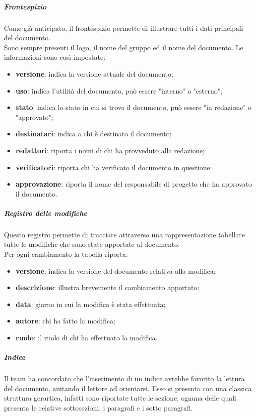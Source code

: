 \subparagraph{Frontespizio}
Come già anticipato, il frontespizio permette di illustrare tutti i dati principali del documento.\\
Sono sempre presenti il logo, il nome del gruppo ed il nome del documento.
Le informazioni sono così impostate:
\begin{itemize}
	\item\textbf{versione}: indica la versione attuale del documento;
	\item\textbf{uso}: indica l'utilità del documento, può essere "interno" o "esterno";
	\item\textbf{stato}: indica lo stato in cui si trova il documento, può essere "in redazione" o "approvato";
	\item\textbf{destinatari}: indica a chi è destinato il documento;
	\item\textbf{redattori}: riporta i nomi di chi ha provveduto alla redazione;
	\item\textbf{verificatori}: riporta chi ha verificato il documento in questione;
	\item\textbf{approvazione}: riporta il nome del responsabile di progetto che ha approvato il documento.
\end{itemize}

\subparagraph{Registro delle modifiche}
Questo registro permette di tracciare attraverso una rappresentazione tabellare tutte le modifiche che sono state apportate al documento. \\
Per ogni cambiamento la tabella riporta:
\begin{itemize}
	\item\textbf{versione}: indica la versione del documento relativa alla modifica;
	\item\textbf{descrizione}: illustra brevemente il cambiamento apportato;
	\item\textbf{data}: giorno in cui la modifica è stata effettuata;
	\item\textbf{autore}: chi ha fatto la modifica;
	\item\textbf{ruolo}: il ruolo di chi ha effettuato la modifica.
\end{itemize}

\subparagraph{Indice}
Il team ha concordato che l'inserimento di un indice avrebbe favorito la lettura del documento, aiutando il lettore ad orientarsi.
Esso si presenta con una classica struttura gerartica, infatti sono riportate tutte le sezione, ognuna delle quali presenta le relative sottosezioni, i paragrafi e i sotto paragrafi.

